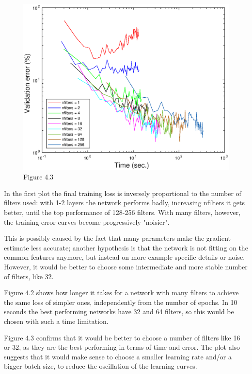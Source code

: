 \documentclass{article}
\begin{document}
    \begin{figure}[!htb]
        \centering
        \includegraphics[width=\textwidth]{figures/sc4_val_err_time}
        \captionsetup{labelformat=empty}
        \caption{Figure 4.3}
    \end{figure}
    
    In the first plot the final training loss is inversely proportional to the number of filters used: with 1-2 layers the network performs badly,
    increasing nfilters it gets better, until the top performance of 128-256 filters. With many filters, however, the training error curves become
    progressively "noisier". 
    
    This is possibly caused by the fact that many parameters make the gradient estimate less accurate;
    another hypothesis is that the network is not fitting on the common features anymore, 
    but instead on more example-specific details or noise.
    However, it would be better to choose some intermediate and more stable number of filters, like 32.
    
    Figure 4.2 shows how longer it takes for a network with many filters to achieve the same loss of simpler ones, 
    independently from the number of epochs. 
    In 10 seconds the best performing networks have 32 and 64 filters, so this would be chosen with such a time limitation.
    
    Figure 4.3 confirms that it would be better to choose a number of filters like 16 or 32, as they are the best performing in terms of time and error.
    The plot also suggests that it would make sense to choose a smaller learning rate and/or a bigger batch size, to reduce the oscillation of the learning curves.
    
\end{document}
